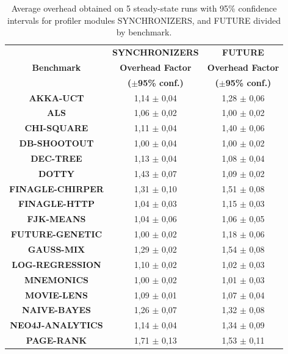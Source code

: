 \documentclass[]{usiinfthesis}
\begin{document}
\begin{table}
\centering
\caption{Average overhead obtained on 5 steady-state runs with 95\% confidence intervals for profiler modules SYNCHRONIZERS, and FUTURE divided by benchmark.}
\begin{tabular}{|c|c|c|}
\hline
		 & 	\textbf{	SYNCHRONIZERS	}	 & 	\textbf{	FUTURE	}	\\
\textbf{	Benchmark	}&	\textbf{	Overhead Factor	}	 & 	\textbf{	Overhead Factor	}	\\
		 & 	\textbf{	 ($\pm$95\% conf.) 	}	 & 	\textbf{	 ($\pm$95\% conf.) 	}	\\
		 
\hline
\textbf{	AKKA-UCT	}&	 1,14 	 $\pm$ 	 0,04 	 & 	 1,28 	 $\pm$ 	 0,06 	\\
\textbf{	ALS	}&	 1,06 	 $\pm$ 	 0,02 	 & 	 1,00 	 $\pm$ 	 0,02 	\\
\textbf{	CHI-SQUARE	}&	 1,11 	 $\pm$ 	 0,04 	 & 	 1,40 	 $\pm$ 	 0,06 	\\
\textbf{	DB-SHOOTOUT	}&	 1,00 	 $\pm$ 	 0,04 	 & 	 1,00 	 $\pm$ 	 0,02 	\\
\textbf{	DEC-TREE	}&	 1,13 	 $\pm$ 	 0,04 	 & 	 1,08 	 $\pm$ 	 0,04 	\\
\textbf{	DOTTY	}&	 1,43 	 $\pm$ 	 0,07 	 & 	 1,09 	 $\pm$ 	 0,02 	\\
\textbf{	FINAGLE-CHIRPER	}&	 1,31 	 $\pm$ 	 0,10 	 & 	 1,51 	 $\pm$ 	 0,08 	\\
\textbf{	FINAGLE-HTTP	}&	 1,04 	 $\pm$ 	 0,03 	 & 	 1,15 	 $\pm$ 	 0,03 	\\
\textbf{	FJK-MEANS	}&	 1,04 	 $\pm$ 	 0,06 	 & 	 1,06 	 $\pm$ 	 0,05 	\\
\textbf{	FUTURE-GENETIC	}&	 1,00 	 $\pm$ 	 0,02 	 & 	 1,18 	 $\pm$ 	 0,06 	\\
\textbf{	GAUSS-MIX	}&	 1,29 	 $\pm$ 	 0,02 	 & 	 1,54 	 $\pm$ 	 0,08 	\\
\textbf{	LOG-REGRESSION	}&	 1,10 	 $\pm$ 	 0,02 	 & 	 1,02 	 $\pm$ 	 0,03 	\\
\textbf{	MNEMONICS	}&	 1,00 	 $\pm$ 	 0,02 	 & 	 1,01 	 $\pm$ 	 0,03 	\\
\textbf{	MOVIE-LENS	}&	 1,09 	 $\pm$ 	 0,01 	 & 	 1,07 	 $\pm$ 	 0,04 	\\
\textbf{	NAIVE-BAYES	}&	 1,26 	 $\pm$ 	 0,07 	 & 	 1,32 	 $\pm$ 	 0,08 	\\
\textbf{	NEO4J-ANALYTICS	}&	 1,14 	 $\pm$ 	 0,04 	 & 	 1,34 	 $\pm$ 	 0,09 	\\
\textbf{	PAGE-RANK	}&	 1,71 	 $\pm$ 	 0,13 	 & 	 1,53 	 $\pm$ 	 0,11 	\\

\end{tabular}
\end{table}
\end{document}
